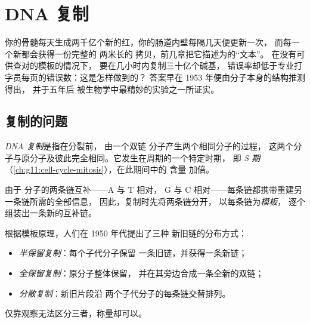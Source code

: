 \chapter{DNA 复制}\label{ch:g11:dna-replication}

你的骨髓每天生成两千亿个新的红，你的肠道内壁每隔几天便更新一次，
而每一个新都会获得一份完整的
两米长的  拷贝，前几章把它描述为的“文本”。
在没有可供查对的模板的情况下，
要在几小时内复制三十亿个碱基，
错误率却低于专业打字员每页的错误数：这是怎样做到的？
答案早在 1953 年便由分子本身的结构推测得出，
并于五年后
被生物学中最精妙的实验之一所证实。

\section{复制的问题}

\begin{definition}[复制]\label{def:g11:dna-replication:replication}
\emph{DNA 复制}是指在分裂前，
由一个双链  分子产生两个相同分子的过程，
这两个分子与原分子及彼此完全相同。它发生在周期的一个特定时期，
即 \emph{S 期}
（\cref{ch:g11:cell-cycle-mitosis}），在此期间中的  含量
加倍。
\end{definition}

\begin{proposition}[模板原理]\label{prop:g11:dna-replication:template}
由于  分子的两条链互补——A 与 T 相对，
G 与 C 相对——每条链都携带重建另一条链所需的全部信息，
因此，复制时先将两条链分开，
以每条链为\emph{模板}，
逐个组装出一条新的互补链。
\end{proposition}
\admitted

\begin{example}[三种可能的结果]\label{ex:g11:dna-replication:models}
根据模板原理，人们在 1950 年代提出了三种
新旧链的分布方式：
\begin{itemize}
  \item \emph{半保留复制}：每个子代分子保留
        一条旧链，并获得一条新链；
  \item \emph{全保留复制}：原分子整体保留，
        并在其旁边合成一条全新的双链；
  \item \emph{分散复制}：新旧片段沿
        两个子代分子的每条链交替排列。
\end{itemize}
仅靠观察无法区分三者，称量却可以。
\end{example}

